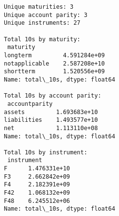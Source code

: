 \documentclass[11pt]{article}
\begin{document}
    \begin{Verbatim}[commandchars=\\\{\}]
Unique maturities: 3
Unique account parity: 3
Unique instruments: 27

Total 10s by maturity:
 maturity
longterm         4.591284e+09
notapplicable    2.587208e+10
shortterm        1.520556e+09
Name: total\_10s, dtype: float64

Total 10s by account parity:
 accountparity
assets         1.693683e+10
liabilities    1.493577e+10
net            1.113110e+08
Name: total\_10s, dtype: float64

Total 10s by instrument:
 instrument
F      1.476331e+10
F3     2.662842e+09
F4     2.182391e+09
F42    1.068132e+09
F48    6.245512e+06
Name: total\_10s, dtype: float64
    \end{Verbatim}
\end{document}

